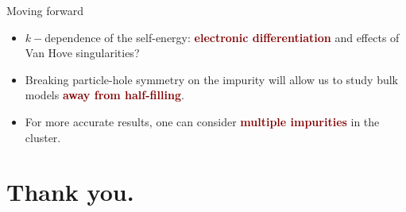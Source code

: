 \documentclass[aspectratio=169]{beamer}
\newcommand{\focus}[1]{\textcolor{maroon}{\textbf{#1}}}
\begin{document}
\begin{frame}[noframenumbering]{Moving forward}
\begin{itemize}[<+->]
	\item \(k-\)dependence of the self-energy: \focus{electronic differentiation} and effects of Van Hove singularities?
	\item Breaking particle-hole symmetry on the impurity will allow us to study bulk models \focus{away from half-filling}.
	\item For more accurate results, one can consider \focus{multiple impurities} in the cluster.
\end{itemize}
\end{frame}

\section{Thank you.}
\end{document}
